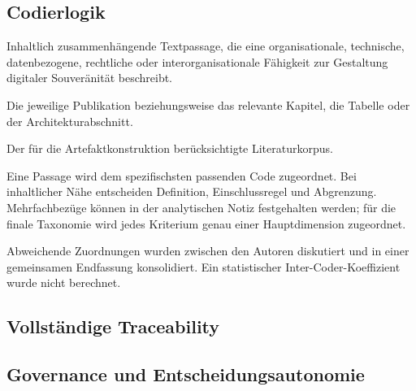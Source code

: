 \documentclass[10pt,a4paper]{article}
\begin{document}
\subsection{Codierlogik}

\begin{description}[style=nextline,leftmargin=35mm,labelwidth=31mm,font=\sffamily\bfseries\color{DeepNavy}]
  \item[Kodiereinheit] Inhaltlich zusammenhängende Textpassage, die eine organisationale, technische, datenbezogene, rechtliche oder interorganisationale Fähigkeit zur Gestaltung digitaler Souveränität beschreibt.
  \item[Kontexteinheit] Die jeweilige Publikation beziehungsweise das relevante Kapitel, die Tabelle oder der Architekturabschnitt.
  \item[Auswertungseinheit] Der für die Artefaktkonstruktion berücksichtigte Literaturkorpus.
  \item[Zuordnungsregel] Eine Passage wird dem spezifischsten passenden Code zugeordnet. Bei inhaltlicher Nähe entscheiden Definition, Einschlussregel und Abgrenzung. Mehrfachbezüge können in der analytischen Notiz festgehalten werden; für die finale Taxonomie wird jedes Kriterium genau einer Hauptdimension zugeordnet.
  \item[Konsensbildung] Abweichende Zuordnungen wurden zwischen den Autoren diskutiert und in einer gemeinsamen Endfassung konsolidiert. Ein statistischer Inter-Coder-Koeffizient wurde nicht berechnet.
\end{description}

\subsection{Vollständige Traceability}
\subsection{Governance und Entscheidungsautonomie}
\label{supp:dimension-1}
\end{document}
